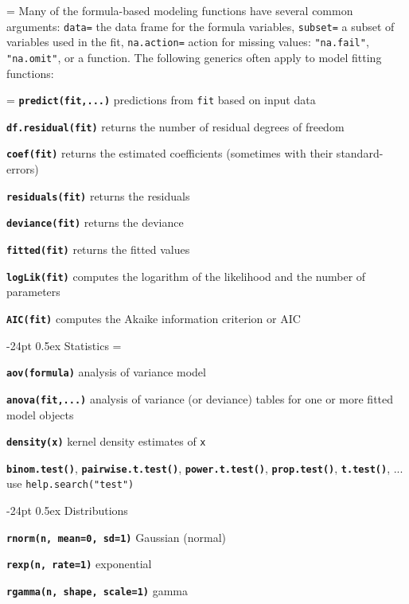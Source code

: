 \documentclass[10pt,landscape]{article}
\makeatletter
\renewcommand\section{\@startsection{section}{1}{0mm}%
                                     {-24pt}%
                                     {0.5ex}%
                                {\color{blue}\normalfont\large\bfseries}}
\newcommand{\code}{\texttt}
\newcommand{\bcode}[1]{\texttt{\textbf{#1}}}
\makeatother
\begin{document}
\begin{multicols*}{3}
\everypar={\hangindent=0mm}
Many of the formula-based modeling functions have several common
arguments: \code{data=} the data frame for the formula variables,
\code{subset=} a subset of variables used in the fit,
\code{na.action=} action for missing values: \code{"na.fail"}, \code{"na.omit"}, or
a function. The following generics often apply to model fitting functions: 

\everypar={\hangindent=9mm}
\bcode{predict(fit,...)}  predictions from \code{fit} based on input data

\bcode{df.residual(fit)}  returns the number of residual degrees of freedom

\bcode{coef(fit)}  returns the estimated coefficients (sometimes with their standard-errors)

\bcode{residuals(fit)}  returns the residuals

\bcode{deviance(fit)}  returns the deviance

\bcode{fitted(fit)}  returns the fitted values

\bcode{logLik(fit)}  computes the logarithm of the likelihood and the number of parameters

\bcode{AIC(fit)}  computes the Akaike information criterion or AIC


\section{Statistics}
\everypar={\hangindent=9mm}

\bcode{aov(formula)} analysis of variance model

\bcode{anova(fit,...)} analysis of variance (or deviance) tables for one or more
     fitted model objects

\bcode{density(x)} kernel density estimates of \code{x}

\bcode{binom.test()}, \bcode{pairwise.t.test()}, \bcode{power.t.test()},
\bcode{prop.test()}, \bcode{t.test()}, ... use
\code{help.search("test")} 





\section{Distributions}

\bcode{rnorm(n, mean=0, sd=1)} Gaussian (normal)  

\bcode{rexp(n, rate=1)} exponential

\bcode{rgamma(n, shape, scale=1)} gamma  


\end{multicols*}
\end{document}
